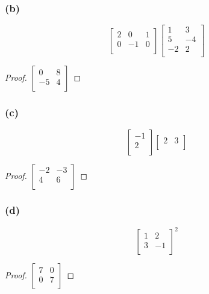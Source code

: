 \documentclass[14pt]{extarticle}
\begin{document}
\subsubsection{(b)}
\[
\left[ 
\begin{array}{rrr}
2 & 0 & 1 \\
0 & -1 & 0 \\
\end{array}
\right]
\left[ 
\begin{array}{rr}
1 & 3 \\
5 & -4 \\
-2 & 2 \\
\end{array}
\right]
\]
\begin{proof}
\(\left[ 
\begin{array}{rr}
0 & 8 \\
-5 & 4 \\
\end{array}
\right]\)
\end{proof}

\subsubsection{(c)}
\[
\left[ 
\begin{array}{r}
-1 \\
2 \\
\end{array}
\right]
\left[ 
\begin{array}{rr}
2 & 3 \\
\end{array}
\right]
\]
\begin{proof}
\(\left[ 
\begin{array}{rr}
-2 & -3 \\
4 & 6 \\
\end{array}
\right]\)
\end{proof}

\subsubsection{(d)}
\[
\left[ 
\begin{array}{rr}
1 & 2 \\
3 & -1 \\
\end{array}
\right]^2
\]
\begin{proof}
\(\left[ 
\begin{array}{rr}
7 & 0 \\
0 & 7 \\
\end{array}
\right]\)
\end{proof}
\end{document}
